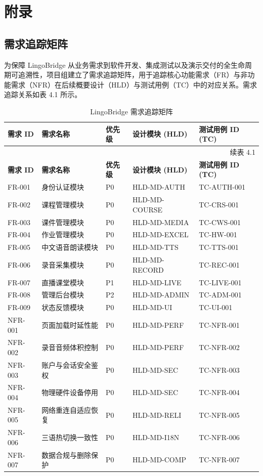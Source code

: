 \chapter{附录}

\section{需求追踪矩阵}
为保障 LingoBridge 从业务需求到软件开发、集成测试以及演示交付的全生命周期可追溯性，项目组建立了需求追踪矩阵，用于追踪核心功能需求（FR）与非功能需求（NFR）在后续概要设计（HLD）与测试用例（TC）中的对应关系。需求追踪关系如表 4.1 所示。

\begin{longtable}{l p{4cm} l l l}
\caption{LingoBridge 需求追踪矩阵} \label{tab:traceability} \\
\toprule
\textbf{需求 ID} & \textbf{需求名称} & \textbf{优先级} & \textbf{设计模块 (HLD)} & \textbf{测试用例 ID (TC)} \\
\midrule
\endfirsthead
\multicolumn{5}{r}{续表 4.1} \\
\toprule
\textbf{需求 ID} & \textbf{需求名称} & \textbf{优先级} & \textbf{设计模块 (HLD)} & \textbf{测试用例 ID (TC)} \\
\midrule
\endhead
\bottomrule
\endfoot
\bottomrule
\endlastfoot
FR-001 & 身份认证模块 & P0 & HLD-MD-AUTH & TC-AUTH-001 \\
FR-002 & 课程管理模块 & P0 & HLD-MD-COURSE & TC-CRS-001 \\
FR-003 & 课件管理模块 & P0 & HLD-MD-MEDIA & TC-CWS-001 \\
FR-004 & 作业管理模块 & P0 & HLD-MD-EXCEL & TC-HW-001 \\
FR-005 & 中文语音朗读模块 & P0 & HLD-MD-TTS & TC-TTS-001 \\
FR-006 & 录音采集模块 & P0 & HLD-MD-RECORD & TC-REC-001 \\
FR-007 & 直播课堂模块 & P1 & HLD-MD-LIVE & TC-LIVE-001 \\
FR-008 & 管理后台模块 & P2 & HLD-MD-ADMIN & TC-ADM-001 \\
FR-009 & 状态反馈模块 & P0 & HLD-MD-UI & TC-UI-001 \\
NFR-001 & 页面加载时延性能 & P0 & HLD-MD-PERF & TC-NFR-001 \\
NFR-002 & 录音音频体积控制 & P0 & HLD-MD-PERF & TC-NFR-002 \\
NFR-003 & 账户与会话安全鉴权 & P0 & HLD-MD-SEC & TC-NFR-003 \\
NFR-004 & 物理硬件设备停用 & P0 & HLD-MD-SEC & TC-NFR-004 \\
NFR-005 & 网络重连自适应恢复 & P0 & HLD-MD-RELI & TC-NFR-005 \\
NFR-006 & 三语热切换一致性 & P0 & HLD-MD-I18N & TC-NFR-006 \\
NFR-007 & 数据合规与删除保护 & P0 & HLD-MD-COMP & TC-NFR-007 \\
\end{longtable}

